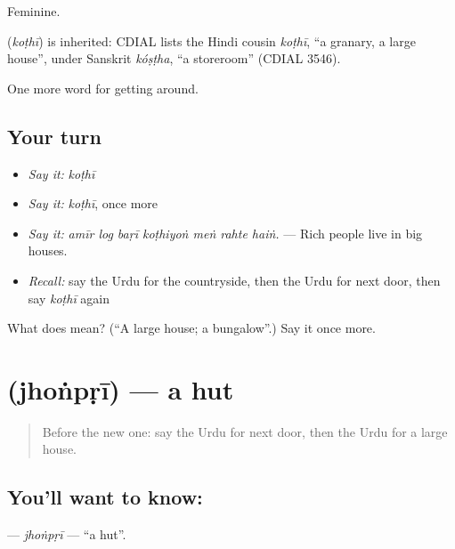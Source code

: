 Feminine.

\begin{cousinweb}
\textbf{} (\emph{koṭhī}) is inherited: CDIAL lists the Hindi cousin \emph{koṭhī}, \textquotedblleft{}a granary, a large house\textquotedblright{}, under Sanskrit \emph{kóṣṭha}, \textquotedblleft{}a storeroom\textquotedblright{} (CDIAL 3546).
\end{cousinweb}

\begin{grammarlens}[title={What you've built}]
One more word for getting around.
\end{grammarlens}

\subsection*{Your turn}
\begin{itemize}
\raggedright
  \item \emph{Say it:} \emph{koṭhī}
  \item \emph{Say it:} \emph{koṭhī}, once more
  \item \emph{Say it:} \emph{amīr log baṛī koṭhiyoṅ meṅ rahte haiṅ.} — Rich people live in big houses.
  \item \emph{Recall:} say the Urdu for the countryside, then the Urdu for next door, then say \emph{koṭhī} again
\end{itemize}

\begin{tcolorbox}[breakable,colback=teal!4,colframe=teal!35!black,title={Before you move on}]
What does  mean? (\textquotedblleft{}A large house; a bungalow\textquotedblright{}.) Say it once more.
\end{tcolorbox}
\section[\texorpdfstring{\ur{جھونپڑی} (jhoṅpṛī)}{جھونپڑی (jhoṅpṛī)}]{ (jhoṅpṛī) — a hut}

\label{lesson:UR-C413-jhonpri}



\begin{quote}
Before the new one: say the Urdu for next door, then the Urdu for a large house.
\end{quote}

\subsection*{You'll want to know: }
\textbf{} — \emph{jhoṅpṛī} — \textquotedblleft{}a hut\textquotedblright{}.

